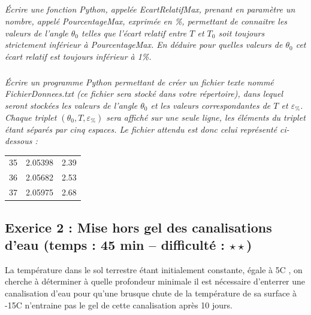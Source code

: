 \documentclass[10pt,oneside]{article}
\begin{document}
\subparagraph{}
\textit{Écrire une fonction Python, appelée EcartRelatifMax, prenant en paramètre un nombre, appelé
PourcentageMax, exprimée en \%, permettant de connaitre les valeurs de l’angle $\theta_0$ telles que l’écart relatif entre $T$ et $T_0$ soit toujours strictement inférieur à PourcentageMax. En déduire pour quelles valeurs de $\theta_0$ cet écart relatif est toujours inférieur à 1\%.}

\subparagraph{\label{q9}}
\textit{Écrire un programme Python permettant de créer un fichier texte nommé FichierDonnees.txt (ce fichier sera stocké dans votre répertoire), dans lequel seront stockées les valeurs de l’angle $\theta_0$  et les valeurs correspondantes de $T$ et $\varepsilon_{\%}$. Chaque triplet $(\theta_0,T,\varepsilon_{\%})$ sera affiché sur une seule ligne, les
éléments du triplet étant séparés par cinq espaces. Le fichier attendu est donc celui représenté ci-dessous
:}

\begin{tabular}{lll}
35& 2.05398 &2.39\\
36 &2.05682 &2.53\\
37 &2.05975 &2.68
\end{tabular}

\newpage

\subsection*{Exerice 2 : Mise hors gel des canalisations d'eau (temps : 45 min – difficulté : $\star\star $)}

La température dans le sol terrestre étant initialement constante, égale à 5\textdegree C , on cherche à déterminer
à quelle profondeur minimale il est nécessaire d’enterrer une canalisation d’eau pour qu’une brusque
chute de la température de sa surface à -15\textdegree C n’entraine pas le gel de cette canalisation après 10 jours.
\end{document}
